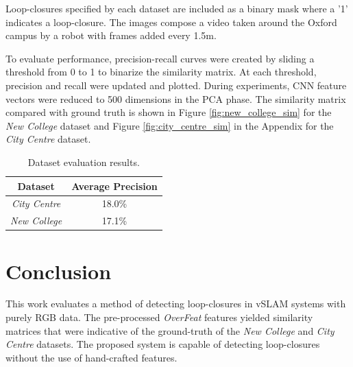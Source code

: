\documentclass[10pt,twocolumn,letterpaper]{article}
\begin{document}
\noindent Loop-closures specified by each dataset are included as a binary mask where a '1' indicates a loop-closure. The images compose a video taken around the Oxford campus by a robot with frames 
added every 1.5m.

To evaluate performance, precision-recall curves were created by sliding a threshold from 0 to 1 to binarize the similarity matrix. At each threshold, precision and recall were updated and plotted. 
During experiments, CNN feature vectors were reduced to 500 dimensions in the PCA phase. The similarity matrix compared with ground truth is shown in Figure \ref{fig:new_college_sim} for the \textit{New 
College} dataset and Figure \ref{fig:city_centre_sim} in the Appendix for the \textit{City Centre} dataset.

\begin{table}[H]
\caption{Dataset evaluation results.}
\label{tab:results}
\centering
\begin{tabular}{c||c}
Dataset & Average Precision\\
\hline
\textit{City Centre} & 18.0\%\\
\textit{New College} & 17.1\%\\
\end{tabular}
\end{table}


\section{Conclusion}
\label{sec:conclusion}

This work evaluates a method of detecting loop-closures in vSLAM systems with purely RGB data. The pre-processed \textit{OverFeat} features yielded similarity matrices that were indicative of the 
ground-truth of the \textit{New College} and \textit{City Centre} datasets. The proposed system is capable of detecting loop-closures without the use of hand-crafted features.
\end{document}
